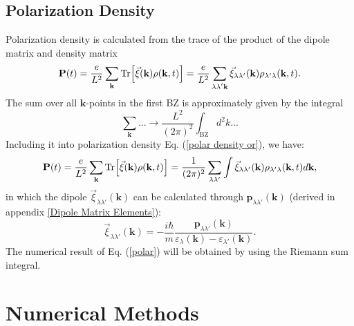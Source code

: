 \documentclass[12pt,english,a4paper]{article}
\begin{document}
\subsection{Polarization Density}
\quad Polarization density is calculated from the trace of the product of the dipole matrix and density matrix
\begin{equation}
\label{polar density or}
\textbf{P}(t) = \frac{e}{L^2} \sum_{\textbf{k}}\Tr[\vec{\xi}(\textbf{k})\rho(\textbf{k},t)] = \frac{e}{L^2}\sum_{\substack{\lambda \lambda'\textbf{k}}} \vec{\xi}_{\lambda \lambda' }(\textbf{k})\rho_{\lambda' \lambda}(\textbf{k},t).
\end{equation}
\quad The sum over all $\textbf{k}$-points in the first BZ is approximately given by the integral
\begin{equation}
\sum_{\textbf{k}}... \to \frac{L^2}{(2\pi)^2}\int_{\mathrm{BZ}} d^2 k...
\end{equation}
\quad Including it into polarization density Eq. (\ref{polar density or}), we have:
\begin{equation}
	\label{polar}
\textbf{P}(t) = \frac{e}{L^2} \sum_{\textbf{k}} \Tr[\vec{\xi} (\textbf{k}) \rho(\textbf{k},t)] = \frac{1}{(2\pi)^2} \sum_{\lambda\lambda'}	\int \vec{\xi}_{\lambda \lambda'} (\textbf{k}) \rho_{\lambda'\lambda}(\textbf{k},t)d\textbf{k},
\end{equation}
in which the dipole $\vec{\xi}_{\lambda \lambda'}(\textbf{k})$ can be calculated through $\textbf{p}_{\lambda \lambda'}(\textbf{k})$ (derived in appendix \ref{Dipole Matrix Elements}):
\begin{equation}
	\vec{\xi}_{\lambda \lambda'} (\textbf{k}) = -\frac{i\hbar }{m} \frac{\textbf{p}_{\lambda \lambda'}(\textbf{k})}{\varepsilon_{\lambda}(\textbf{k}) - \varepsilon_{\lambda'}(\textbf{k})}.
\end{equation}
\quad The numerical result of Eq. (\ref{polar}) will be obtained by using the Riemann sum integral.
\newpage
\section{Numerical Methods}
\end{document}
